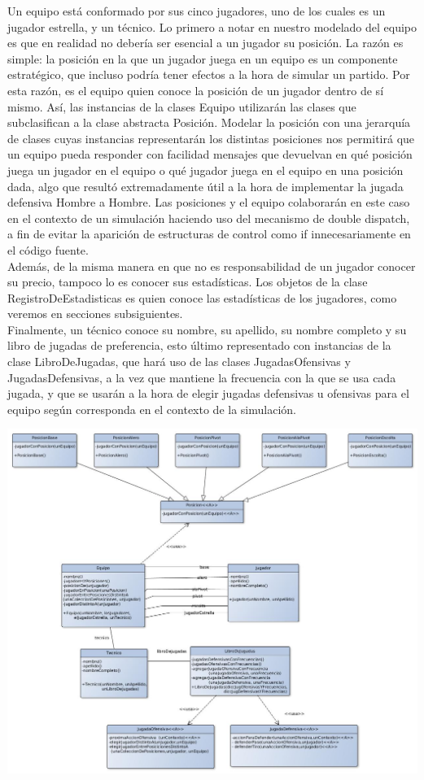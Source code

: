 Un equipo está conformado por sus cinco jugadores, uno de los cuales es un jugador estrella, y un técnico.
Lo primero a notar en nuestro modelado del equipo es que en realidad no debería ser esencial a un jugador su posición. La razón es simple: la posición en la que un jugador juega en un equipo es un componente estratégico, que incluso podría tener efectos a la hora de simular un partido. Por esta razón, es el equipo quien conoce la posición de un jugador dentro de sí mismo. Así, las instancias de la clases Equipo utilizarán las clases que subclasifican a la clase abstracta Posición. Modelar la posición con una jerarquía de clases cuyas instancias representarán los distintas posiciones nos permitirá que un equipo pueda responder con facilidad mensajes que devuelvan en qué posición juega un jugador en el equipo o qué jugador juega en el equipo en una posición dada, algo que resultó extremadamente útil a la hora de implementar la jugada defensiva Hombre a Hombre. Las posiciones y el equipo colaborarán en este caso en el contexto de un simulación haciendo uso del mecanismo de double dispatch, a fin de evitar la aparición de estructuras de control como if innecesariamente en el código fuente.\\
Además, de la misma manera en que no es responsabilidad de un jugador conocer su precio, tampoco lo es conocer sus estadísticas. Los objetos de la clase RegistroDeEstadisticas es quien conoce las estadísticas de los jugadores, como veremos en secciones subsiguientes.\\
Finalmente, un técnico conoce su nombre, su apellido, su nombre completo y su libro de jugadas de preferencia, esto último representado con instancias de la clase LibroDeJugadas, que hará uso de las clases JugadasOfensivas y JugadasDefensivas, a la vez que mantiene la frecuencia con la que se usa cada jugada, y que se usarán a la hora de elegir jugadas defensivas u ofensivas para el equipo según corresponda en el contexto de la simulación.\\
\begin{center}
\includegraphics[scale=0.30]{diseno/equipo.jpg} 
\end{center}

